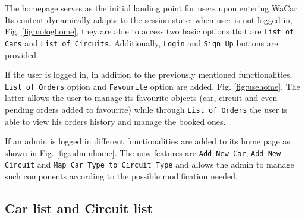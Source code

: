 The homepage serves as the initial landing point for users upon entering WaCar. Its content dynamically adapts to the session state: when user is not logged in, Fig. \ref{fig:nologhome}, they are able to access two basic options that are \texttt{List of Cars} and \texttt{List of Circuits}. Additionally, \texttt{Login} and \texttt{Sign Up} buttons are provided.

If the user is logged in, in addition to the previously mentioned functionalities, \texttt{List of Orders} option and \texttt{Favourite} option are added, Fig. \ref{fig:usehome}. The latter allows the user to manage its favourite objects (car, circuit and even pending orders added to favourite) while through \texttt{List of Orders} the user is able to view his orders history and manage the booked ones.

If an admin is logged in different functionalities are added to its home page as shown in Fig. \ref{fig:adminhome}. The new features are \texttt{Add New Car}, \texttt{Add New Circuit} and \texttt{Map Car Type to Circuit Type} and allows the admin to manage such components according to the possible modification needed.

\subsection{Car list and Circuit list}

